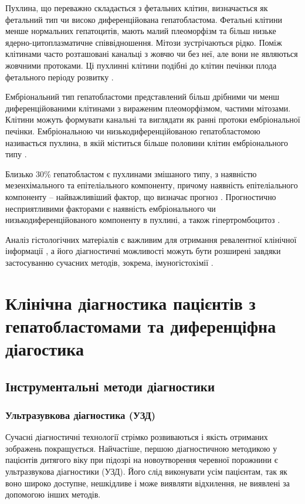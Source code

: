 Пухлина, що переважно складається з фетальних клітин, визначається як фетальний тип чи високо диференційована гепатобластома. Фетальні клітини менше нормальних гепатоцитів, мають малий плеоморфізм та більш низьке ядерно-цитоплазматичне співвідношення. Мітози зустрічаються рідко. Поміж клітинами часто розташовані канальці з жовчю чи без неї, але вони не являються жовчними протоками. Ці пухлинні клітини подібні до клітин печінки плода фетального періоду розвитку \cite{pmid16176410}.

Ембріональний тип гепатобластоми представлений більш дрібними чи менш диференційованими клітинами з вираженим плеоморфізмом, частими мітозами. Клітини можуть формувати канальні та виглядати як ранні протоки ембріональної печінки. Ембріональною чи низькодиференційованою гепатобластомою називається пухлина, в якій міститься більше половини клітин ембріонального типу \cite{pmid11792985}.

Близько 30\% гепатобластом є пухлинами змішаного типу, з наявністю мезенхімального та епітеліального компоненту, причому наявність епітеліального компоненту –  найважливіший фактор, що визначає прогноз \cite{pmid11819207}. Прогностично несприятливими факторами є наявність ембріонального чи низькодиференційованого компоненту в пухлині, а також  гіпертромбоцитоз \cite{pmid11792985} \cite{pmid28620649}.

Аналіз гістологічних матеріалів є важливим для отримання ревалентної клінічної інформації \cite{pmid25783395}, а його діагностичні можливості можуть бути розширені завдяки застосуванню сучасних методів, зокрема, імуногістохімії \cite{pmid25945430}.  

\section{Клінічна діагностика пацієнтів з гепатобластомами та диференціфна діагостика}
\subsection{Інструментальні методи діагностики}
\subsubsection{Ультразувкова діагностика (УЗД)} 

Сучасні діагностичні технології стрімко розвиваються і якість отриманих зображень покращується. Найчастіше, першою діагностичною методикою у пацієнтів дитягого віку при підозрі на новоутворення черевної порожнини є ультразвукова діагностики (УЗД). Його слід виконувати усім пацієнтам, так як воно широко доступне, нешкідливе і може виявляти відхилення, не виявлені за допомогою інших методів.

